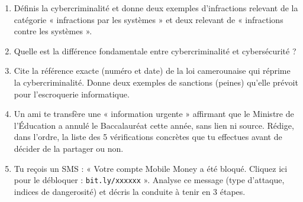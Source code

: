 \documentclass[11pt]{article}
\begin{document}
\begin{exercice}
\begin{enumerate}
\item Définis la cybercriminalité et donne deux exemples d'infractions relevant de la catégorie « infractions par les systèmes » et deux relevant de « infractions contre les systèmes ».
\item Quelle est la différence fondamentale entre cybercriminalité et cybersécurité ?
\item Cite la référence exacte (numéro et date) de la loi camerounaise qui réprime la cybercriminalité. Donne deux exemples de sanctions (peines) qu'elle prévoit pour l'escroquerie informatique.
\item Un ami te transfère une « information urgente » affirmant que le Ministre de l'Éducation a annulé le Baccalauréat cette année, sans lien ni source. Rédige, dans l'ordre, la liste des 5 vérifications concrètes que tu effectues avant de décider de la partager ou non.
\item Tu reçois un SMS : « Votre compte Mobile Money a été bloqué. Cliquez ici pour le débloquer : \texttt{bit.ly/xxxxxx} ». Analyse ce message (type d'attaque, indices de dangerosité) et décris la conduite à tenir en 3 étapes.
\end{enumerate}
\end{exercice}
\end{document}
